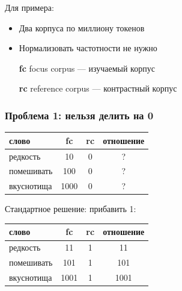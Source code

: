 \documentclass[svgnames]{beamer}
\begin{document}
\begin{frame}
  Для примера: 
\begin{itemize}
\item Два корпуса по миллиону токенов
\item Нормализовать частотности не нужно
\item[\textbf{fc}] focus corpus — изучаемый корпус
\item[\textbf{rc}] reference corpus — контрастный корпус
\end{itemize}
\end{frame}

\begin{frame}
  \frametitle{Проблема 1:  нельзя делить на 0}
  \begin{tabular}[l]{lccc}
    слово & fc & rc & отношение \\
    \hline
    редкость & 10 & 0 &  ? \\
    помешивать & 100 & 0 &  ? \\
    вкуснотища & 1000 & 0 &  ? \\
  \end{tabular}

Стандартное решение: прибавить 1:

  \begin{tabular}[l]{lccc}
    слово & fc & rc & отношение \\
    \hline
    редкость & 11 & 1 &  11 \\
    помешивать & 101 & 1 &  101 \\
    вкуснотища & 1001 & 1 &  1001 \\
  \end{tabular}
\end{frame}
\end{document}
